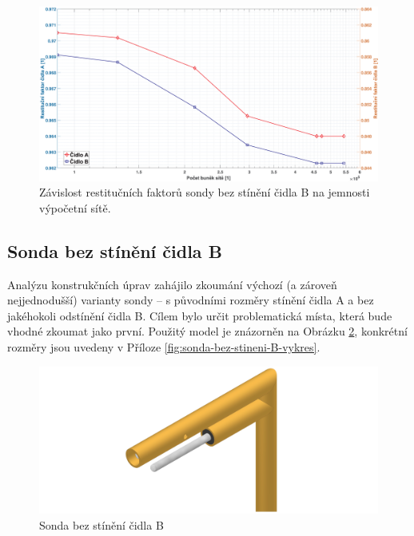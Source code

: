         \begin{figure}[ht!]
            \centering
            \includegraphics*[width=\textwidth]{400_SIMULACE_KONSTRUKCNICH_UPRAV/Grafy/citlivost_site.eps}
            \caption{Závislost restitučních faktorů sondy bez stínění čidla B na jemnosti výpočetní sítě.}
            \label{fig:citlivost-site}
        \end{figure}
    \newpage
    \subsection{Sonda bez stínění čidla B} \label{sec:sonda-bez-stineni-B}
        Analýzu konstrukčních úprav zahájilo zkoumání výchozí (a zároveň nejjednodušší) varianty sondy – s původními rozměry stínění čidla A a bez jakéhokoli odstínění čidla B. Cílem bylo určit problematická místa, která bude vhodné zkoumat jako první. Použitý model je znázorněn na Obrázku \ref{fig:sonda-bez-stineni-B}, konkrétní rozměry jsou uvedeny v Příloze \ref{fig:sonda-bez-stineni-B-vykres}. 

        \begin{figure}[ht!]
            \centering
            \includegraphics[width=\textwidth]{400_SIMULACE_KONSTRUKCNICH_UPRAV/Vykresy_rendery/Sonda_bez_stineni_B.png}
            \caption{Sonda bez stínění čidla B}
            \label{fig:sonda-bez-stineni-B}
        \end{figure}
        
